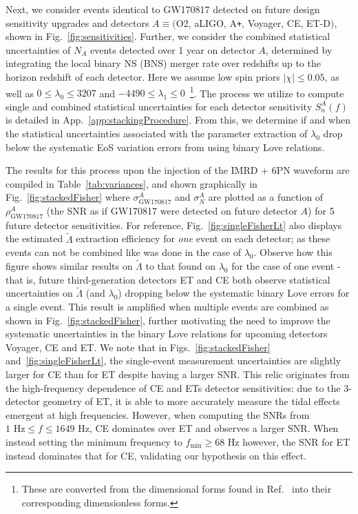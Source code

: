 \documentclass[prd,twocolumn,nofootinbib,superscriptaddress,amsmath,amssymb]{revtex4-1}
\begin{document}
Next, we consider events identical to GW170817 detected on future design sensitivity upgrades and detectors $A \equiv ($O2, aLIGO, A\texttt{+}, Voyager, CE, ET-D$)$, shown in Fig.~\ref{fig:sensitivities}.
Further, we consider the combined statistical uncertainties of $N_A$ events detected over 1 year on detector $A$, determined by integrating the local binary NS (BNS) merger rate over redshifts up to the horizon redshift of each detector.
Here we assume low spin priors $|\chi| \leq 0.05$, as well as $0 \leq \lambda_0 \leq 3207$ and $-4490 \leq \lambda_1 \leq 0$~\cite{delPozzo:TaylorTidal}\footnote{These are converted from the dimensional forms found in Ref.~\cite{delPozzo:TaylorTidal} into their corresponding dimensionless forms.}.
The process we utilize to compute single and combined statistical uncertainties for each detector sensitivity $S_n^A(f)$ is detailed in App.~\ref{app:stackingProcedure}.
From this, we determine if and when the statistical uncertainties associated with the parameter extraction of $\lambda_0$ drop below the systematic EoS variation errors from using binary Love relations.

The results for this process upon the injection of the IMRD + 6PN waveform are compiled in Table~\ref{tab:variances}, and shown graphically in Fig.~\ref{fig:stackedFisher} where $\sigma^A_{\text{GW170817}}$ and $\sigma^A_N$ are plotted as a function of $\rho^A_{\text{GW170817}}$ (the SNR as if GW170817 were detected on future detector $A$) for 5 future detector sensitivities.
For reference, Fig.~\ref{fig:singleFisherLt} also displays the estimated $\tilde\Lambda$ extraction efficiency for \emph{one} event on each detector; as these events can not be combined like was done in the case of $\lambda_0$.
Observe how this figure shows similar results on $\tilde\Lambda$ to that found on $\lambda_0$ for the case of one event - that is, future third-generation detectors ET and CE both observe statistical uncertainties on $\tilde\Lambda$ (and $\lambda_0$) dropping below the systematic binary Love errors for a single event.
This result is amplified when multiple events are combined as shown in Fig.~\ref{fig:stackedFisher}, further motivating the need to improve the systematic uncertainties in the binary Love relations for upcoming detectors Voyager, CE and ET.
We note that in Figs.~\ref{fig:stackedFisher} and~\ref{fig:singleFisherLt}, the single-event measurement uncertainties are slightly larger for CE than for ET despite having a larger SNR.
This relic originates from the high-frequency dependence of CE and ETs detector sensitivities: due to the 3-detector geometry of ET, it is able to more accurately measure the tidal effects emergent at high frequencies.
However, when computing the SNRs from $1 \text{ Hz} \leq f \leq 1649 \text{ Hz}$, CE dominates over ET and observes a larger SNR.
When instead setting the minimum frequency to $f_{\text{min}} \geq 68$ Hz however, the SNR for ET instead dominates that for CE, validating our hypothesis on this effect.
\end{document}
